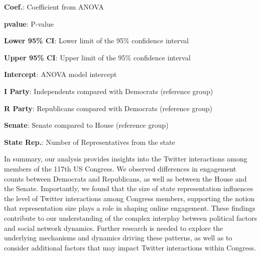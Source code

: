 \documentclass[11pt]{article}
\begin{document}
\begin{table}[h]
\caption{ANOVA results for the effect of state representation size on Twitter interactions, controlling for party and chamber}
\label{table:table_2}
\begin{threeparttable}
\renewcommand{\TPTminimum}{\linewidth}
\begin{tablenotes}
\footnotesize
\item \textbf{Coef.}: Coefficient from ANOVA
\item \textbf{pvalue}: P-value
\item \textbf{Lower 95\% CI}: Lower limit of the 95\% confidence interval
\item \textbf{Upper 95\% CI}: Upper limit of the 95\% confidence interval
\item \textbf{Intercept}: ANOVA model intercept
\item \textbf{I Party}: Independents compared with Democrats (reference group)
\item \textbf{R Party}: Republicans compared with Democrats (reference group)
\item \textbf{Senate}: Senate compared to House (reference group)
\item \textbf{State Rep.}: Number of Representatives from the state
\end{tablenotes}
\end{threeparttable}
\end{table}


In summary, our analysis provides insights into the Twitter interactions among members of the 117th US Congress. We observed differences in engagement counts between Democrats and Republicans, as well as between the House and the Senate. Importantly, we found that the size of state representation influences the level of Twitter interactions among Congress members, supporting the notion that representation size plays a role in shaping online engagement. These findings contribute to our understanding of the complex interplay between political factors and social network dynamics. Further research is needed to explore the underlying mechanisms and dynamics driving these patterns, as well as to consider additional factors that may impact Twitter interactions within Congress.
\end{document}
